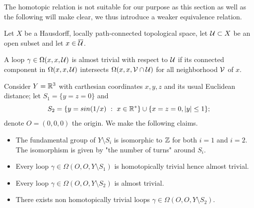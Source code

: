The homotopic relation is not suitable for our purpose as this section as well as the following will make clear, we thus introduce a weaker equivalence relation.

\begin{defi}\label{def:almost_trivial_loop} Let $X$ be a Hausdorff, locally path-connected topological space, let $\mathcal{U}\subset X$ be an open subset and let $x\in \overline {\mathcal{U}}$.

A loop $\gamma\in \Omega(x,x,\mathcal{U})$ is  almost trivial with respect to $\mathcal{U}$ if its connected component in $\Omega(x,x,\mathcal{U})$ intersects $\Omega(x,x,\mathcal V\cap \mathcal{U})$ for all neighborhood $\mathcal V$ of $x$. 
\end{defi}
\begin{ex}\label{ex:consider_carthesian_coordinates_usual}
 Consider $Y = \mathbb R^3$ with carthesian coordinates $x,y,z$ and its usual Euclidean distance; let  $S_1= \{y=z=0\}$ and $$S_2=\{y=sin(1/x) ~:~ x\in \mathbb R^*\}\cup \{x=z=0, |y|\leq 1 \};$$ denote $O=(0,0,0)$ the origin. 
 We make the following claims.
 \begin{itemize}
  \item  The fundamental group of $Y\setminus S_i$ is isomorphic to $\mathbb{Z}$ for both $i=1$ and $i=2$. The isomorphism is given by "the number of turns" around $S_i$. 
  \item Every loop  $\gamma\in \Omega(O,O,Y\setminus S_1)$ is homotopically trivial hence almost trivial.
  \item Every loop  $\gamma\in \Omega(O,O,Y\setminus S_2)$ is almost trivial. 
  \item There exists non homotopically trivial loops $\gamma\in \Omega(O,O,Y\setminus S_2)$.
 \end{itemize}
\end{ex}
